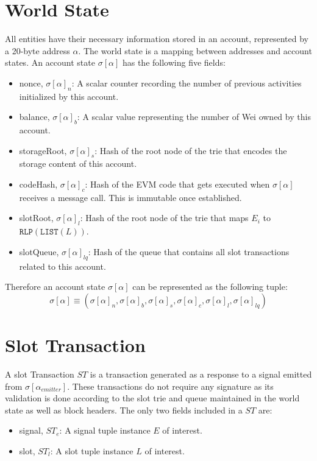 \documentclass{article}
\begin{document}
\section{World State}
All entities have their necessary information stored in an account, represented by a 20-byte address $\alpha$. The world state is a mapping between addresses and account states. An account state $\sigma[\alpha]$ has the following five fields:
\begin{itemize}
    \item nonce, $\sigma[\alpha]_n$: A scalar counter recording the number of previous activities initialized by this account.
    \item balance, $\sigma[\alpha]_b$: A scalar value representing the number of Wei owned by this account. 
    \item storageRoot, $\sigma[\alpha]_s$: Hash of the root node of the trie that encodes the storage content of this account.
    \item codeHash, $\sigma[\alpha]_c$: Hash of the EVM code that gets executed when $\sigma[\alpha]$ receives a message call. This is immutable once established. 
    \item slotRoot, $\sigma[\alpha]_l$: Hash of the root node of the trie that maps $E_{i}$ to $\texttt{RLP}(
    \texttt{LIST}(L))$. 
    \item slotQueue, $\sigma[\alpha]_{lq}$: Hash of the queue that contains all slot transactions related to this account.
\end{itemize}
Therefore an account state $\sigma[\alpha]$ can be represented as the following tuple:
\begin{equation*}
    \sigma[\alpha] \equiv (\sigma[\alpha]_n, \sigma[\alpha]_b, \sigma[\alpha]_s, \sigma[\alpha]_c, \sigma[\alpha]_l, \sigma[\alpha]_{lq})
\end{equation*}


\section{Slot Transaction}
A slot Transaction $ST$ is a transaction generated as a response to a signal emitted from $\sigma[\alpha_{emitter}]$. These transactions do not require any signature as its validation is done according to the slot trie and queue maintained in the world state as well as block headers. The only two fields included in a $ST$ are:
\begin{itemize}
    \item signal, $ST_e$: A signal tuple instance $E$ of interest.
    \item slot, $ST_l$: A slot tuple instance $L$ of interest.
\end{itemize}
\end{document}
